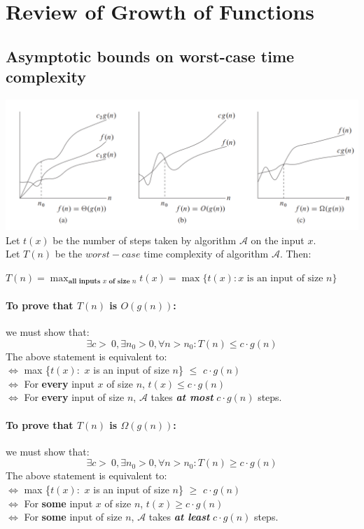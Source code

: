 \documentclass{article}
\begin{document}
\newpage
\tableofcontents

\newpage
\section{Review of Growth of Functions}
\subsection{Asymptotic bounds on worst-case time complexity}
\includegraphics{image001.png}
Let $t(x)$ be the number of steps taken by algorithm $\mathcal{A}$ on the input $x$.\\
Let $T(n)$ be the $worst-case$ time complexity of algorithm $\mathcal{A}$.
Then:
\begin{center}$T(n) = \max_{\textbf{all inputs $x$ of size $n$}} t(x) = \max\{t(x) : x \text{ is an input of size }n\}$\end{center}
\paragraph{To prove that $T(n)$ is $O(g(n))$:} we must show that:\\
$$\exists c >\ 0, \exists n_0 > 0, \forall n > n_0 : T(n) \leq c \cdot g(n)$$
The above statement is equivalent to: \\
$\Leftrightarrow$ max \{$t(x) : $ $x$ is an input of size $n$\} $\leq$ $c \cdot g(n)$ 
\\
$\Leftrightarrow$ For \textbf{every} input $x$ of size $n$, $t(x) \leq c \cdot g(n)$
\\
$\Leftrightarrow$ For \textbf{every} input of size $n$, $\mathcal{A}$ takes \textit{\textbf{at most}} $c \cdot g(n)$ steps.
\paragraph{To prove that $T(n)$ is $\Omega(g(n))$:} we must show that: 
$$\exists c >\ 0, \exists n_0 > 0, \forall n > n_0 : T(n) \geq c \cdot g(n)$$
The above statement is equivalent to: \\
$\Leftrightarrow$ max \{$t(x) : $ $x$ is an input of size $n$\} $\geq$ $c \cdot g(n)$ 
\\
$\Leftrightarrow$ For \textbf{some} input $x$ of size $n$, $t(x) \geq c \cdot g(n)$
\\
$\Leftrightarrow$ For \textbf{some} input of size $n$, $\mathcal{A}$ takes \textit{\textbf{at least}} $c \cdot g(n)$ steps.
\end{document}
